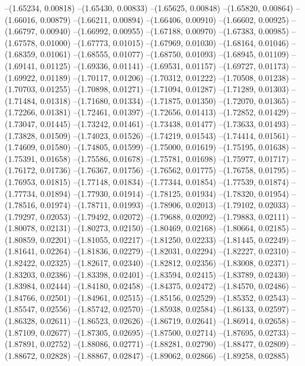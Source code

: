 --(1.65234, 0.00818)
--(1.65430, 0.00833)
--(1.65625, 0.00848)
--(1.65820, 0.00864)
--(1.66016, 0.00879)
--(1.66211, 0.00894)
--(1.66406, 0.00910)
--(1.66602, 0.00925)
--(1.66797, 0.00940)
--(1.66992, 0.00955)
--(1.67188, 0.00970)
--(1.67383, 0.00985)
--(1.67578, 0.01000)
--(1.67773, 0.01015)
--(1.67969, 0.01030)
--(1.68164, 0.01046)
--(1.68359, 0.01061)
--(1.68555, 0.01077)
--(1.68750, 0.01093)
--(1.68945, 0.01109)
--(1.69141, 0.01125)
--(1.69336, 0.01141)
--(1.69531, 0.01157)
--(1.69727, 0.01173)
--(1.69922, 0.01189)
--(1.70117, 0.01206)
--(1.70312, 0.01222)
--(1.70508, 0.01238)
--(1.70703, 0.01255)
--(1.70898, 0.01271)
--(1.71094, 0.01287)
--(1.71289, 0.01303)
--(1.71484, 0.01318)
--(1.71680, 0.01334)
--(1.71875, 0.01350)
--(1.72070, 0.01365)
--(1.72266, 0.01381)
--(1.72461, 0.01397)
--(1.72656, 0.01413)
--(1.72852, 0.01429)
--(1.73047, 0.01445)
--(1.73242, 0.01461)
--(1.73438, 0.01477)
--(1.73633, 0.01493)
--(1.73828, 0.01509)
--(1.74023, 0.01526)
--(1.74219, 0.01543)
--(1.74414, 0.01561)
--(1.74609, 0.01580)
--(1.74805, 0.01599)
--(1.75000, 0.01619)
--(1.75195, 0.01638)
--(1.75391, 0.01658)
--(1.75586, 0.01678)
--(1.75781, 0.01698)
--(1.75977, 0.01717)
--(1.76172, 0.01736)
--(1.76367, 0.01756)
--(1.76562, 0.01775)
--(1.76758, 0.01795)
--(1.76953, 0.01815)
--(1.77148, 0.01834)
--(1.77344, 0.01854)
--(1.77539, 0.01874)
--(1.77734, 0.01894)
--(1.77930, 0.01914)
--(1.78125, 0.01934)
--(1.78320, 0.01954)
--(1.78516, 0.01974)
--(1.78711, 0.01993)
--(1.78906, 0.02013)
--(1.79102, 0.02033)
--(1.79297, 0.02053)
--(1.79492, 0.02072)
--(1.79688, 0.02092)
--(1.79883, 0.02111)
--(1.80078, 0.02131)
--(1.80273, 0.02150)
--(1.80469, 0.02168)
--(1.80664, 0.02185)
--(1.80859, 0.02201)
--(1.81055, 0.02217)
--(1.81250, 0.02233)
--(1.81445, 0.02249)
--(1.81641, 0.02264)
--(1.81836, 0.02279)
--(1.82031, 0.02294)
--(1.82227, 0.02310)
--(1.82422, 0.02325)
--(1.82617, 0.02340)
--(1.82812, 0.02356)
--(1.83008, 0.02371)
--(1.83203, 0.02386)
--(1.83398, 0.02401)
--(1.83594, 0.02415)
--(1.83789, 0.02430)
--(1.83984, 0.02444)
--(1.84180, 0.02458)
--(1.84375, 0.02472)
--(1.84570, 0.02486)
--(1.84766, 0.02501)
--(1.84961, 0.02515)
--(1.85156, 0.02529)
--(1.85352, 0.02543)
--(1.85547, 0.02556)
--(1.85742, 0.02570)
--(1.85938, 0.02584)
--(1.86133, 0.02597)
--(1.86328, 0.02611)
--(1.86523, 0.02626)
--(1.86719, 0.02641)
--(1.86914, 0.02658)
--(1.87109, 0.02677)
--(1.87305, 0.02695)
--(1.87500, 0.02714)
--(1.87695, 0.02733)
--(1.87891, 0.02752)
--(1.88086, 0.02771)
--(1.88281, 0.02790)
--(1.88477, 0.02809)
--(1.88672, 0.02828)
--(1.88867, 0.02847)
--(1.89062, 0.02866)
--(1.89258, 0.02885)
